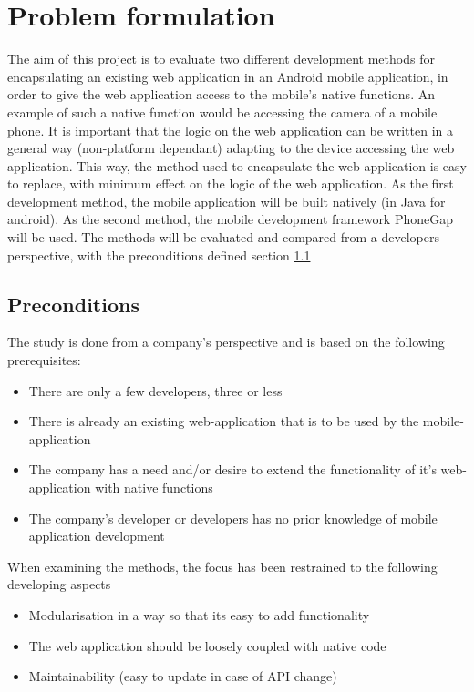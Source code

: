 \documentclass{./tex/cslthse-msc}
\begin{document}
\section{Problem formulation}
The aim of this project is to evaluate two different development methods for encapsulating an existing web application in an Android mobile application, in order to give the web application access to the mobile's native functions. An example of such a native function would be accessing the camera of a mobile phone. It is important that the logic on the web application can be written in a general way (non-platform dependant) adapting to the device accessing the web application. This way, the method used to encapsulate the web application is easy to replace, with minimum effect on the logic of the web application. 
\newline\newline
As the first development method, the mobile application will be built natively (in Java for android). As the second method, the mobile development framework PhoneGap will be used. The methods will be evaluated and compared from a developers perspective, with the preconditions defined section \ref{section-preconditions}

\subsection{Preconditions}\label{section-preconditions}
The study is done from a company's perspective and is based on the following prerequisites:
\begin{itemize}
\item There are only a few developers, three or less
\item There is already an existing web-application that is to be used by the mobile-application
\item The company has a need and/or desire to extend the functionality of it's web-application with native functions
\item The company's developer or developers has no prior knowledge of mobile application development
\end{itemize}

When examining the methods, the focus has been restrained to the following developing aspects
\begin{itemize}
\item Modularisation in a way so that its easy to add functionality
\item The web application should be loosely coupled with native code
\item Maintainability (easy to update in case of API change)
\end{itemize}
\end{document}
